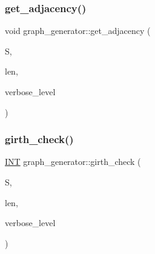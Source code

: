 \mbox{\label{classgraph__generator_af27b8eefa729867d8f3649cd6b7be580}} 
\subsubsection{\texorpdfstring{get\+\_\+adjacency()}{get\_adjacency()}}
{\footnotesize\ttfamily void graph\+\_\+generator\+::get\+\_\+adjacency (\begin{DoxyParamCaption}\item[{\mbox{\hyperlink{galois_8h_a09fddde158a3a20bd2dcadb609de11dc}{I\+NT}} $\ast$}]{S,  }\item[{\mbox{\hyperlink{galois_8h_a09fddde158a3a20bd2dcadb609de11dc}{I\+NT}}}]{len,  }\item[{\mbox{\hyperlink{galois_8h_a09fddde158a3a20bd2dcadb609de11dc}{I\+NT}}}]{verbose\+\_\+level }\end{DoxyParamCaption})}

\mbox{\label{classgraph__generator_ac4952fda4ff10a97e36670ac21749cf0}} 
\subsubsection{\texorpdfstring{girth\+\_\+check()}{girth\_check()}}
{\footnotesize\ttfamily \mbox{\hyperlink{galois_8h_a09fddde158a3a20bd2dcadb609de11dc}{I\+NT}} graph\+\_\+generator\+::girth\+\_\+check (\begin{DoxyParamCaption}\item[{\mbox{\hyperlink{galois_8h_a09fddde158a3a20bd2dcadb609de11dc}{I\+NT}} $\ast$}]{S,  }\item[{\mbox{\hyperlink{galois_8h_a09fddde158a3a20bd2dcadb609de11dc}{I\+NT}}}]{len,  }\item[{\mbox{\hyperlink{galois_8h_a09fddde158a3a20bd2dcadb609de11dc}{I\+NT}}}]{verbose\+\_\+level }\end{DoxyParamCaption})}

\mbox{\label{classgraph__generator_a87d9f35c6f8558ae279c4ed864e5da70}} 
